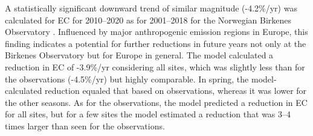 A statistically significant downward trend of similar magnitude
(-4.2\%/yr) was calculated for EC for 2010--2020 as for 2001--2018
for the Norwegian Birkenes Observatory \citep{Yttri2021}. Influenced by
major anthropogenic emission regions in Europe, this finding indicates a
potential for further reductions in future years not only at the Birkenes
Observatory but for Europe in general.  The model calculated a reduction
in EC of -3.9\%/yr considering all sites, which was slightly less than
for the observations (-4.5\%/yr) but highly comparable. In spring,
the model-calculated reduction equaled that based on observations,
whereas it was lower for the other seasons. As for the observations,
the model predicted a reduction in EC for all sites, but for a few sites
the model estimated a reduction that was 3--4 times larger than seen
for the observations.

